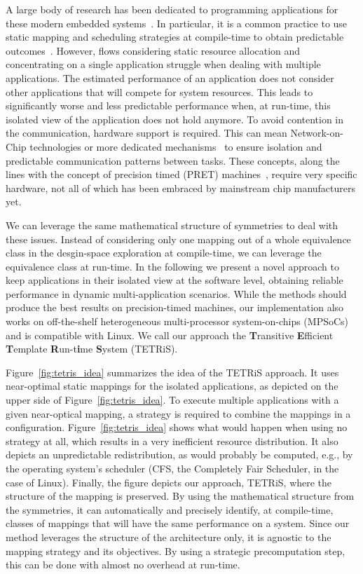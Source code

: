 \documentclass[sigplan,10pt]{acmart}
\begin{document}
A large body of research has been dedicated to programming applications for these modern embedded systems~\cite{eker2003taming,thiele2007mapping,maps08,pimentel2006systematic,nikolov2008daedalus}.
In particular, it is a common practice to use static mapping and scheduling strategies at compile-time to obtain predictable outcomes~\cite{bekooij2004predictable}.
However, flows considering static resource allocation and concentrating on a single application struggle when dealing with multiple applications.
The estimated performance of an application does not consider other applications that will compete for system resources.
This leads to significantly worse and less predictable performance when, at run-time, this isolated view of the application does not hold anymore.
To avoid contention in the communication, hardware support is required.
This can mean Network-on-Chip technologies or more dedicated mechanisms~\cite{hansson2009compsoc,kumar2008analyzing} to ensure isolation and predictable communication patterns between tasks. 
These concepts, along the lines with the concept of precision timed (PRET) machines~\cite{edwards2007case}, require very specific hardware, not all of which has been embraced by mainstream chip manufacturers yet.

We can leverage the same mathematical structure of symmetries to deal with these issues.
Instead of considering only one mapping out of a whole equivalence class in the desgin-space exploration at compile-time, we can leverage the equivalence class at run-time.
In the following we present a novel approach to keep applications in their isolated view at the software level, obtaining reliable performance in dynamic multi-application scenarios.
While the methods should produce the best results on precision-timed machines, our implementation also works on off-the-shelf heterogeneous multi-processor system-on-chips (MPSoCs) and is compatible with Linux.
We call our approach the \textbf{T}ransitive \textbf{E}fficient \textbf{T}emplate \textbf{R}un-t\textbf{i}me \textbf{S}ystem (TETRiS).

Figure~\ref{fig:tetris_idea} summarizes the idea of the TETRiS approach.
It uses near-optimal static mappings for the isolated applications, as depicted on the upper side of Figure~\ref{fig:tetris_idea}.
To execute multiple applications with a given near-optical mapping, a strategy is required to combine the mappings in a configuration.
Figure~\ref{fig:tetris_idea} shows what would happen when using no strategy at all, which results in a very inefficient resource distribution.
It also depicts an unpredictable redistribution, as would probably be computed, e.g., by the operating system's scheduler (CFS, the Completely Fair Scheduler, in the case of Linux).
Finally, the figure depicts our approach, TETRiS, where the structure of the mapping is preserved.
By using the mathematical structure from the symmetries, it can automatically and precisely identify, at compile-time, classes of mappings that will have the same performance on a system.
Since our method leverages the structure of the architecture only, it is agnostic to the mapping strategy and its objectives.
By using a strategic precomputation step, this can be done with almost no overhead at run-time. 
\end{document}
